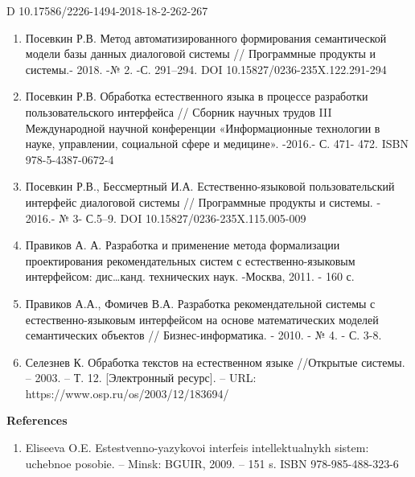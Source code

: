 D 10.17586/2226-1494-2018-18-2-262-267

\begin{enumerate}
\def\labelenumi{\arabic{enumi}.}
\setcounter{enumi}{11}
\item
  Посевкин Р.В. Метод автоматизированного формирования семантической
  модели базы данных диалоговой системы // Программные продукты и
  системы.- 2018. -№ 2. -С. 291--294. DOI 10.15827/0236-235X.122.291-294
\item
  Посевкин Р.В. Обработка естественного языка в процессе разработки
  пользовательского интерфейса // Сборник научных трудов III
  Международной научной конференции «Информационные технологии в науке,
  управлении, социальной сфере и медицине». -2016.- С. 471- 472. ISBN
  978-5-4387-0672-4
\item
  Посевкин Р.В., Бессмертный И.А. Естественно-языковой пользовательский
  интерфейс диалоговой системы // Программные продукты и системы. -
  2016.- № 3- С.5--9. DOI 10.15827/0236-235X.115.005-009
\item
  Правиков А. А. Разработка и применение метода формализации
  проектирования рекомендательных систем с естественно-языковым
  интерфейсом: дис\ldots канд. технических наук. -Москва, 2011. - 160 с.
\item
  Правиков А.А., Фомичев В.А. Разработка рекомендательной системы с
  естественно-языковым интерфейсом на основе математических моделей
  семантических объектов // Бизнес-информатика. - 2010. - № 4. - С. 3-8.
\item
  Селезнев К. Обработка текстов на естественном языке //Открытые
  системы. -- 2003. -- Т. 12. {[}Электронный ресурс{]}. -- URL:
  https://www.osp.ru/os/2003/12/183694/
\end{enumerate}

{\bfseries References}

\begin{enumerate}
\def\labelenumi{\arabic{enumi}.}
\setcounter{enumi}{17}
\item
  Eliseeva O.E. Estestvenno-yazykovoi interfeis
  intellektual\textquotesingle nykh sistem: uchebnoe posobie. -- Minsk:
  BGUIR, 2009. -- 151 s. ISBN 978-985-488-323-6
\end{enumerate}

